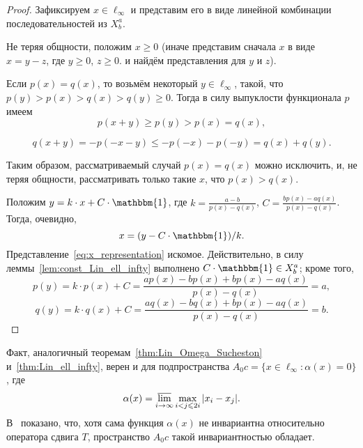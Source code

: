 \documentclass[a4paper,14pt]{article} %
\theoremstyle{plain}
\begin{document}
\begin{proof}
	Зафиксируем $x \in \ell_\infty$ и представим его в виде линейной комбинации последовательностей из $X^a_b$.

	Не теряя общности, положим $x\geq 0$
	(иначе представим сначала $x$ в виде $x = y - z$, где $y \geq 0$, $z \geq 0$.
	и найдём представления для $y$ и $z$).

	Если $p(x) = q(x)$, то возьмём некоторый $y\in\ell_\infty$,
	такой, что $p(y) > p(x) > q(x)  > q(y) \geq 0$.
	Тогда в силу выпуклости функционала $p$ имеем
	\begin{equation}
		p(x+y) \geq p(y) > p(x) = q(x)
		,
	\end{equation}


	\begin{equation}
		q(x+y) = -p(-x-y) \leq -p(-x) -p(-y) = q(x) + q(y)
		.
	\end{equation}

	Таким образом, рассматриваемый случай $p(x) = q(x)$ можно исключить,
	и, не теряя общности, рассматривать только такие $x$, что $p(x) > q(x)$.

	Положим $y=k\cdot x + C\cdot\mathbbm{1}$,
	где $k=\frac{a-b}{p(x)-q(x)}$, $C=\frac{bp(x)-aq(x)}{p(x)-q(x)}$.
	Тогда, очевидно,
	\begin{equation}
		\label{eq:x_representation}
		x=(y-C\cdot\mathbbm{1})/k
		.
	\end{equation}
	Представление~\eqref{eq:x_representation} искомое.
	Действительно, в силу леммы~\ref{lem:const_Lin_ell_infty} выполнено
	$C\cdot\mathbbm{1}\in X^a_b$; кроме того,
	\begin{equation}
		p(y) = k\cdot p(x) + C
		=
		\frac{ap(x)-bp(x)+bp(x)-aq(x)}{p(x)-q(x)}
		=
		a
		,
	\end{equation}
	\begin{equation}
		q(y) = k\cdot q(x) + C
		=
		\frac{aq(x)-bq(x)+bp(x)-aq(x)}{p(x)-q(x)}
		=
		b
		.
	\end{equation}
\end{proof}

Факт, аналогичный теоремам~\ref{thm:Lin_Omega_Sucheston} и~\ref{thm:Lin_ell_infty}, верен и для подпространства
$A_0 c = \{ x \in \ell_\infty : \alpha(x) =0 \}$,
где~\cite{our-vzms-2018}
\begin{equation*}
	\alpha(x) = \varlimsup_{i\to\infty} \max_{i<j\leqslant 2i} |x_i - x_j|
	.
\end{equation*}
В~\cite{our-ped-2018-alpha-Tx} показано, что, хотя сама функция $\alpha(x)$ не инвариантна относительно оператора сдвига $T$,
пространство $A_0 c$ такой инвариантностью обладает.
\end{document}
